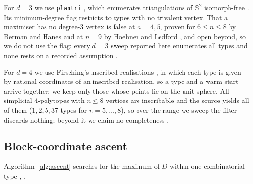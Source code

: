 For $d = 3$ we use \texttt{plantri} \cite{brinkmann-mckay-2007}, which
enumerates triangulations of $\mathbb{S}^{2}$ isomorph-free .
Its minimum-degree
flag restricts to types with no trivalent vertex. That a maximiser has no
degree-3 vertex is false at $n = 4, 5$, proven for $6 \leq n \leq 8$ by Berman
and Hanes \cite{berman-hanes-1970} and at $n = 9$ by Hoehner and Ledford
\cite{hoehner-ledford-2026}, and open beyond, so we do not use the flag: every
$d = 3$ sweep reported here enumerates all types and none rests on a recorded
assumption .

For $d = 4$ we use Firsching's inscribed realisations \cite{firsching-2017},
in which each type is given by rational coordinates of an inscribed
realisation, so a type and a warm start arrive together; we keep only those
whose points lie on the unit sphere. All simplicial 4-polytopes with $n \leq 8$
vertices are inscribable and the source yields all of them ($1, 2, 5, 37$ types
for $n = 5,\dots,8$), so over the range we sweep the filter discards nothing;
beyond it we claim no completeness .

\subsection{Block-coordinate ascent}
\label{sec:ascent}

Algorithm~\ref{alg:ascent} searches for the maximum of $D$ within one combinatorial type
, .

